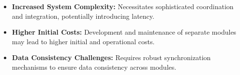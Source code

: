 \begin{itemize}[noitemsep]
    \item \textbf{Increased System Complexity:} Necessitates sophisticated coordination and integration, potentially introducing latency.
    \item \textbf{Higher Initial Costs:} Development and maintenance of separate modules may lead to higher initial and operational costs.
    \item \textbf{Data Consistency Challenges:} Requires robust synchronization mechanisms to ensure data consistency across modules.
\end{itemize}